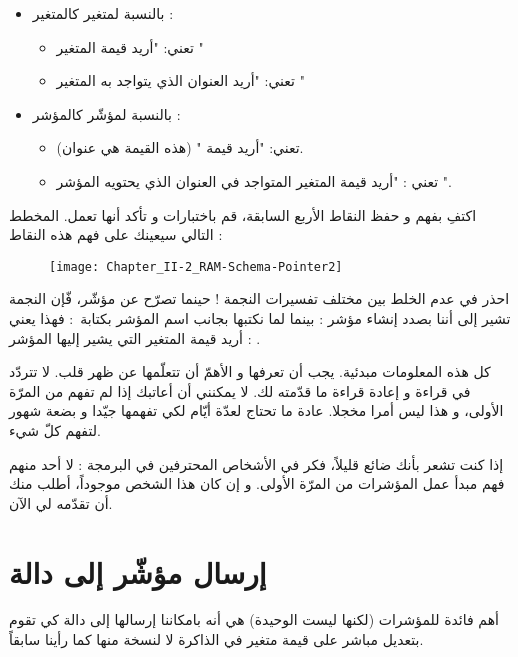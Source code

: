\begin{itemize}
	\item بالنسبة لمتغير كالمتغير
 :
	\begin{itemize}
		\item {} تعني: "أريد قيمة المتغير
"
		\item {}
تعني: "أريد العنوان الذي يتواجد به المتغير
"
	\end{itemize}
	\item بالنسبة لمؤشّر كالمؤشر
 :
	\begin{itemize}
		\item {}
تعني: "أريد قيمة
"
(هذه القيمة هي عنوان).
		\item {}
تعني : "أريد قيمة المتغير المتواجد في العنوان الذي يحتويه المؤشر
".
	\end{itemize}
\end{itemize}

اكتفِ بفهم و حفظ النقاط الأربع السابقة، قم باختبارات و تأكد أنها تعمل. المخطط التالي سيعينك على فهم هذه النقاط :

\begin{figure}[H]
	\centering
	\texttt{[image: Chapter\_II-2\_RAM-Schema-Pointer2]}
\end{figure}


\begin{warning}
احذر في عدم الخلط بين مختلف تفسيرات النجمة ! حينما تصرّح عن مؤشّر، فّإن النجمة تشير إلى أننا بصدد إنشاء مؤشر :
بينما لما نكتبها بجانب اسم المؤشر بكتابة~:
فهذا يعني : أريد قيمة المتغير التي يشير إليها المؤشر
.
\end{warning}

كل هذه المعلومات مبدئية. يجب أن تعرفها و الأهمّ أن تتعلّمها عن ظهر قلب. لا تتردّد في قراءة و إعادة قراءة ما قدّمته لك. لا يمكنني أن أعاتبك إذا لم تفهم من المرّة الأولى، و هذا ليس أمرا مخجلا. عادة ما تحتاج لعدّة أيّام لكي تفهمها جيّدا و بضعة شهور لتفهم كلّ شيء.

إذا كنت تشعر بأنك ضائع قليلاً، فكر في الأشخاص المحترفين في البرمجة : لا أحد منهم فهم مبدأ عمل المؤشرات من المرّة الأولى. و إن كان هذا الشخص موجوداً، أطلب منك أن تقدّمه لي الآن.

\section{إرسال مؤشّر إلى دالة}
أهم فائدة للمؤشرات (لكنها ليست الوحيدة) هي أنه بامكاننا إرسالها إلى دالة كي تقوم بتعديل مباشر على قيمة متغير في الذاكرة لا لنسخة منها كما رأينا سابقاً.

